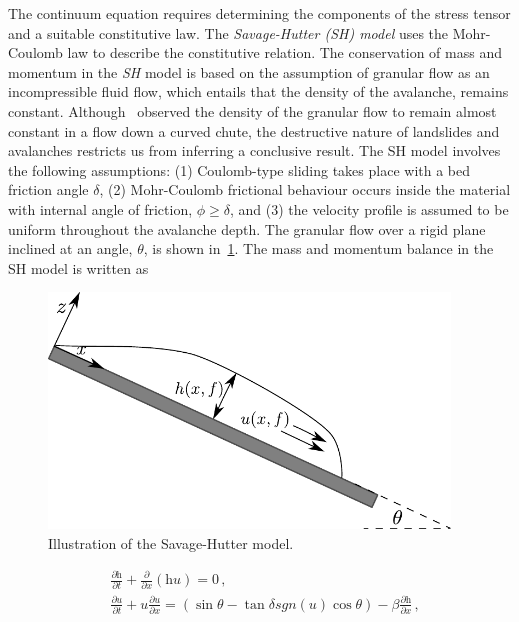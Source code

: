 The continuum equation requires determining the components of the stress tensor 
and a suitable constitutive law. The \textit{Savage-Hutter (SH) model} uses the 
Mohr-Coulomb law to describe the constitutive relation. The conservation of 
mass and momentum in the \textit{SH} model is based on the assumption of 
granular flow as an incompressible fluid flow, which entails that the density 
of the avalanche, remains constant. 
Although~\citet{Hutter1995} observed the density of the granular flow to remain 
almost constant in a flow down a curved chute, the destructive nature of 
landslides and avalanches restricts us from inferring a conclusive result. The 
SH model involves the following assumptions: (1) Coulomb-type sliding takes 
place with a bed friction angle $\delta$, (2) Mohr-Coulomb frictional behaviour 
occurs inside the material with internal angle of friction, $\phi \ge \delta$, 
and (3) the velocity profile is assumed to be uniform throughout the avalanche 
depth. The granular flow over a rigid plane inclined at an angle, $\theta$, is 
shown in~\cref{fig:SH}. The mass and momentum balance in the SH model is 
written as
%
\begin{figure}[htbp]
\centering
\includegraphics[width=0.95\textwidth]{SH}
\caption{Illustration of the Savage-Hutter model.}
\label{fig:SH}
\end{figure}
%
\begin{align}
&\frac{\partial \textit{h}}{\partial \textit{t}} + \frac{\partial}{\partial 
\textit{x}} (\textit{hu})  =  0 \,, \\
&\frac{\partial \textit{u}}{\partial \textit{t}} + \textit{u} \frac{\partial 
\textit{u}}{\partial \textit{x}}  = (\sin \theta - \tan \delta 
\textit{sgn}(\textit{u}) \cos \theta) -\beta \frac{\partial 
\textit{h}}{\partial \textit{x}} \,,
\end{align}
